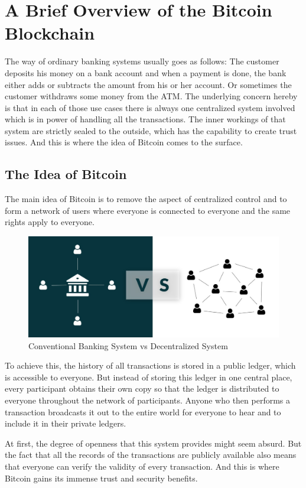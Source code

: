 \documentclass[a4paper, 12pt]{report}
\begin{document}
\chapter{A Brief Overview of the Bitcoin Blockchain}
\par The way of ordinary banking systems usually goes as follows: The customer deposits his money on a bank account and when a payment is done, the bank either adds or subtracts the amount from his or her account. Or sometimes the customer withdraws some money from the ATM. The underlying concern hereby is that in each of those use cases there is always one centralized system involved which is in power of handling all the transactions. The inner workings of that system are strictly sealed to the outside, which has the capability to create trust issues. And this is where the idea of Bitcoin comes to the surface.

\section{The Idea of Bitcoin}
\par The main idea of Bitcoin is to remove the aspect of centralized control and to form a network of users where everyone is connected to everyone and the same rights apply to everyone.  

\begin{figure}[h]
	\includegraphics[width=\textwidth]{01_Decentralized}
	\caption{Conventional Banking System vs Decentralized System}
	\label{fig:01_Decentralized}
\end{figure}

\par To achieve this, the history of all transactions is stored in a public ledger, which is accessible to everyone. But instead of storing this ledger in one central place, every participant obtains their own copy so that the ledger is distributed to everyone throughout the network of participants. Anyone who then performs a transaction broadcasts it out to the entire world for everyone to hear and to include it in their private ledgers. 
\par At first, the degree of openness that this system provides might seem absurd. But the fact that all the records of the transactions are publicly available also means that everyone can verify the validity of every transaction. And this is where Bitcoin gains its immense trust and security benefits.
\end{document}
